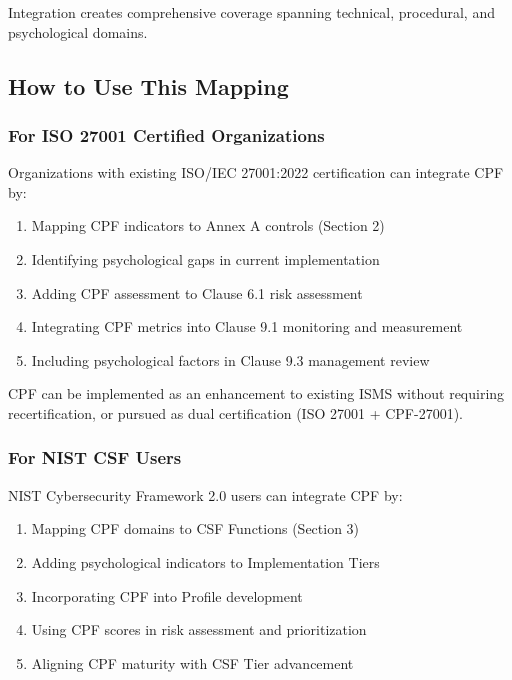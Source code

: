 \documentclass[11pt,a4paper]{article}
\begin{document}
Integration creates comprehensive coverage spanning technical, procedural, and psychological domains.

\subsection{How to Use This Mapping}

\subsubsection{For ISO 27001 Certified Organizations}

Organizations with existing ISO/IEC 27001:2022 certification can integrate CPF by:

\begin{enumerate}
\item Mapping CPF indicators to Annex A controls (Section 2)
\item Identifying psychological gaps in current implementation
\item Adding CPF assessment to Clause 6.1 risk assessment
\item Integrating CPF metrics into Clause 9.1 monitoring and measurement
\item Including psychological factors in Clause 9.3 management review
\end{enumerate}

CPF can be implemented as an enhancement to existing ISMS without requiring recertification, or pursued as dual certification (ISO 27001 + CPF-27001).

\subsubsection{For NIST CSF Users}

NIST Cybersecurity Framework 2.0 users can integrate CPF by:

\begin{enumerate}
\item Mapping CPF domains to CSF Functions (Section 3)
\item Adding psychological indicators to Implementation Tiers
\item Incorporating CPF into Profile development
\item Using CPF scores in risk assessment and prioritization
\item Aligning CPF maturity with CSF Tier advancement
\end{enumerate}
\end{document}
